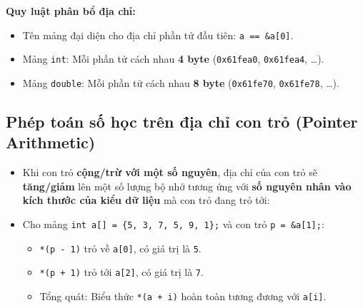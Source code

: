 \documentclass[12pt,a4paper]{article}
\begin{document}
\noindent\textbf{Quy luật phân bổ địa chỉ:}
\begin{itemize}[itemsep=0.15em]
    \item Tên mảng đại diện cho địa chỉ phần tử đầu tiên: \texttt{a == \&a[0]}.
    \item Mảng \texttt{int}: Mỗi phần tử cách nhau \textbf{4 byte} (\texttt{0x61fea0}, \texttt{0x61fea4}, \dots).
    \item Mảng \texttt{double}: Mỗi phần tử cách nhau \textbf{8 byte} (\texttt{0x61fe70}, \texttt{0x61fe78}, \dots).
\end{itemize}

\subsection{Phép toán số học trên địa chỉ con trỏ (Pointer Arithmetic)}
\begin{itemize}[itemsep=0.2em]
    \item Khi con trỏ \textbf{cộng/trừ với một số nguyên}, địa chỉ của con trỏ sẽ \textbf{tăng/giảm} lên một số lượng bộ nhớ tương ứng với \textbf{số nguyên nhân vào kích thước của kiểu dữ liệu} mà con trỏ đang trỏ tới:
    \begin{center}
    \end{center}
    \item Cho mảng \texttt{int a[] = \{5, 3, 7, 5, 9, 1\};} và con trỏ \texttt{p = \&a[1];}:
    \begin{itemize}
        \item \texttt{*(p - 1)} trỏ về \texttt{a[0]}, có giá trị là \texttt{5}.
        \item \texttt{*(p + 1)} trỏ tới \texttt{a[2]}, có giá trị là \texttt{7}.
        \item Tổng quát: Biểu thức \texttt{*(a + i)} hoàn toàn tương đương với \texttt{a[i]}.
    \end{itemize}
\end{itemize}
\end{document}
